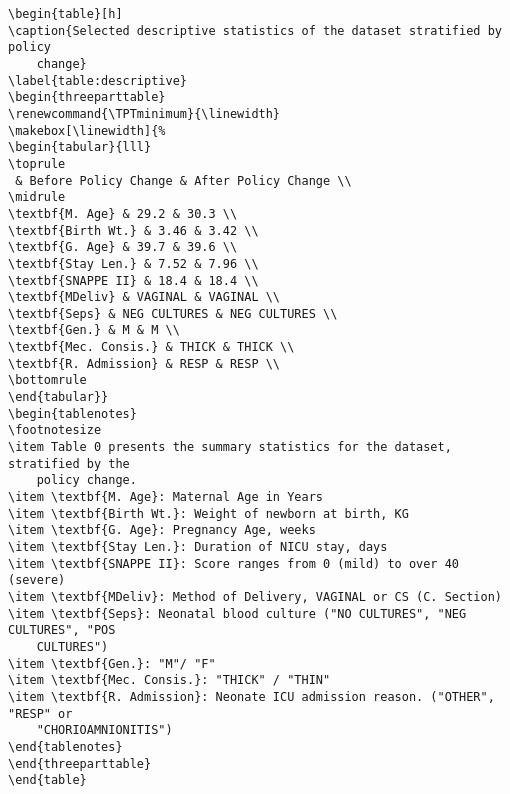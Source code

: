 \documentclass[11pt]{article}
\begin{document}
\begin{Verbatim}[tabsize=4]
\begin{table}[h]
\caption{Selected descriptive statistics of the dataset stratified by policy
	change}
\label{table:descriptive}
\begin{threeparttable}
\renewcommand{\TPTminimum}{\linewidth}
\makebox[\linewidth]{%
\begin{tabular}{lll}
\toprule
 & Before Policy Change & After Policy Change \\
\midrule
\textbf{M. Age} & 29.2 & 30.3 \\
\textbf{Birth Wt.} & 3.46 & 3.42 \\
\textbf{G. Age} & 39.7 & 39.6 \\
\textbf{Stay Len.} & 7.52 & 7.96 \\
\textbf{SNAPPE II} & 18.4 & 18.4 \\
\textbf{MDeliv} & VAGINAL & VAGINAL \\
\textbf{Seps} & NEG CULTURES & NEG CULTURES \\
\textbf{Gen.} & M & M \\
\textbf{Mec. Consis.} & THICK & THICK \\
\textbf{R. Admission} & RESP & RESP \\
\bottomrule
\end{tabular}}
\begin{tablenotes}
\footnotesize
\item Table 0 presents the summary statistics for the dataset, stratified by the
	policy change.
\item \textbf{M. Age}: Maternal Age in Years
\item \textbf{Birth Wt.}: Weight of newborn at birth, KG
\item \textbf{G. Age}: Pregnancy Age, weeks
\item \textbf{Stay Len.}: Duration of NICU stay, days
\item \textbf{SNAPPE II}: Score ranges from 0 (mild) to over 40 (severe)
\item \textbf{MDeliv}: Method of Delivery, VAGINAL or CS (C. Section)
\item \textbf{Seps}: Neonatal blood culture ("NO CULTURES", "NEG CULTURES", "POS
	CULTURES")
\item \textbf{Gen.}: "M"/ "F"
\item \textbf{Mec. Consis.}: "THICK" / "THIN"
\item \textbf{R. Admission}: Neonate ICU admission reason. ("OTHER", "RESP" or
	"CHORIOAMNIONITIS")
\end{tablenotes}
\end{threeparttable}
\end{table}

\end{Verbatim}
\end{document}
